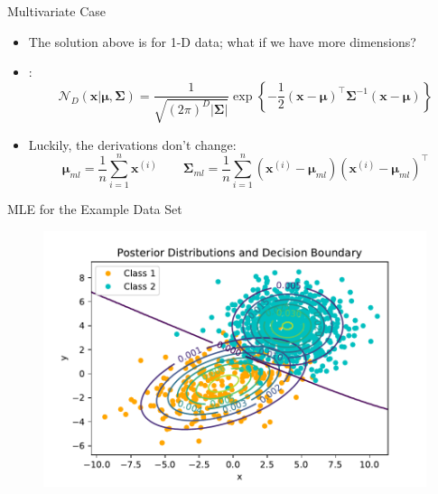 \begin{frame}{Multivariate Case}{}\important
	\begin{itemize}
		\item The solution above is for 1-D data; what if we have more dimensions?
		\item {}:
		\begin{equation}
			\mathcal{N}_D(\bm{x} \vert \bm{\mu}, \bm{\Sigma})
				= \frac{1}{\sqrt{(2 \pi)^D \vert \bm{\Sigma} \vert}}
					\exp\left\{ -\frac{1}{2} (\bm{x} - \bm{\mu})^{\intercal} \bm{\Sigma}^{-1} (\bm{x} - \bm{\mu}) \right\}
		\end{equation}
		\item Luckily, the derivations don't change:
		\begin{equation}
			\bm{\mu}_{ml} = \frac{1}{n} \sum_{i=1}^n \bm{x}^{(i)}
			\qquad
			\bm{\Sigma}_{ml} = \frac{1}{n} \sum_{i=1}^n (\bm{x}^{(i)} - \bm{\mu}_{ml}) (\bm{x}^{(i)} - \bm{\mu}_{ml})^{\intercal}
		\end{equation}
	\end{itemize}
\end{frame}


\begin{frame}{MLE for the Example Data Set}{}
	\begin{figure}
		\centering
		\includegraphics[scale=0.55]{04_density_estimation/02_img/pde_boundary}
	\end{figure}
\end{frame}


